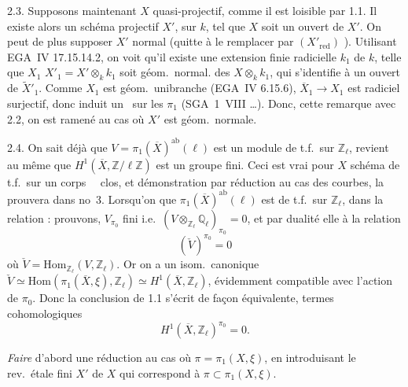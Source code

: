 \documentclass[11pt,a4paper]{article}
\begin{document}
2.3. Supposons maintenant $X$ quasi-projectif, comme il est loisible par 1.1. Il existe alors un schéma \struck{\ill{}} projectif $X'$, sur $k$, tel que $X$ soit \struck{\ill{}}  un ouvert de $X'$. On peut de plus supposer $X'$ normal (quitte à le remplacer par $(X'_{\mathrm{red}})$ ). Utilisant \struck{\ill{}} EGA~IV 17.15.14.2, on voit qu'il  existe une extension finie radicielle $k_1$ de $k$, telle que $X_1$  $X'_1 = X' \otimes_k k_1$ soit géom.\ normal.  \ill{} \ill{} \ill{} des \ill{} \ill{} $X \otimes_k k_1$, qui s'identifie à \struck{\ill{}} un ouvert de $\widetilde{X}'_1$. \struck{\ill{}} Comme $X_1$ est géom.\ unibranche (EGA~IV 6.15.6), $\overline{X}_1 \to X_1$ est radiciel surjectif, donc induit un \ sur  les $\pi_1$ (SGA~1~VIII …). Donc,  cette remarque avec 2.2, on est ramené au cas où $X'$ est géom.\ normale.

2.4. On sait déjà que $V = \pi_1(\overline{X})^{\mathrm{ab}}(\ell)$ est un module de t.f.\ sur $\mathbb{Z}_\ell$,  revient au même que $H^1(\overline{X}, \mathbb{Z}/\ell\mathbb{Z})$ est un groupe fini. Ceci est vrai pour $X$ schéma de t.f.\ sur un corps \ \ clos, et  démonstration par réduction au cas des courbes,  la prouvera dans no~3. Lorsqu'on  \struck{\ill{}} que $\pi_1(\overline{X})^{\mathrm{ab}}(\ell)$ est de t.f.\ sur $\mathbb{Z}_\ell$, dans la relation : \struck{\ill{}} prouvons, \struck{\ill{} \ill{}}  \struck{(\ill{})} $V_{\pi_0}$ fini i.e.\ $(V \otimes_{\mathbb{Z}_\ell} \mathbb{Q}_\ell)_{\pi_0} = 0$, et par dualité elle  à la relation
\[
  (\check{V})^{\pi_0} = 0
\]
où $\check{V} = \mathrm{Hom}_{\mathbb{Z}_\ell}(V, \mathbb{Z}_\ell)$. Or on a un isom.\ canonique $\check{V} \simeq \mathrm{Hom}(\pi_1(\overline{X},\xi), \mathbb{Z}_\ell) \simeq H^1(\overline{X}, \mathbb{Z}_\ell)$, évidemment compatible avec l'action de $\pi_0$. Donc la conclusion de 1.1 s'écrit de façon équivalente,  termes cohomologiques
\begin{equation}
  H^1(\overline{X}, \mathbb{Z}_\ell)^{\pi_0} = 0 . \tag{2.4.1}
\end{equation}

\emph{Faire} d'abord une réduction au cas où $\pi = \pi_1(X,\xi)$, en introduisant \struck{\ill{}} le rev.\ étale fini $X'$ de $X$ qui correspond à $\pi \subset \pi_1(X,\xi)$.
\end{document}
